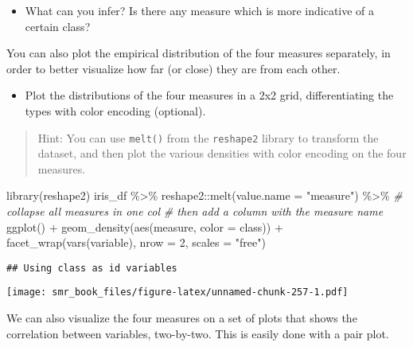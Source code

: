 \documentclass[
  oneside]{book}
\newenvironment{Shaded}{\begin{snugshade}}{\end{snugshade}}
\newcommand{\AttributeTok}[1]{\textcolor[rgb]{0.77,0.63,0.00}{#1}}
\newcommand{\CommentTok}[1]{\textcolor[rgb]{0.56,0.35,0.01}{\textit{#1}}}
\newcommand{\DecValTok}[1]{\textcolor[rgb]{0.00,0.00,0.81}{#1}}
\newcommand{\FunctionTok}[1]{\textcolor[rgb]{0.00,0.00,0.00}{#1}}
\newcommand{\NormalTok}[1]{#1}
\newcommand{\SpecialCharTok}[1]{\textcolor[rgb]{0.00,0.00,0.00}{#1}}
\newcommand{\StringTok}[1]{\textcolor[rgb]{0.31,0.60,0.02}{#1}}
\providecommand{\tightlist}{%
  \setlength{\itemsep}{0pt}\setlength{\parskip}{0pt}}
\begin{document}
\begin{itemize}
\tightlist
\item
  What can you infer? Is there any measure which is more indicative of a certain class?
\end{itemize}

You can also plot the empirical distribution of the four measures
separately, in order to better visualize how far (or close) they
are from each other.

\begin{itemize}
\tightlist
\item
  Plot the distributions of the four measures in a 2x2
  grid, differentiating the types with color encoding (optional).
\end{itemize}

\begin{quote}
Hint: You can use \texttt{melt()} from the \texttt{reshape2} library to
transform the dataset, and then plot the various densities with
color encoding on the four measures.
\end{quote}

\begin{Shaded}
\begin{Highlighting}[]
\FunctionTok{library}\NormalTok{(reshape2)}
\NormalTok{iris\_df }\SpecialCharTok{\%\textgreater{}\%}
\NormalTok{  reshape2}\SpecialCharTok{::}\FunctionTok{melt}\NormalTok{(}\AttributeTok{value.name =} \StringTok{"measure"}\NormalTok{) }\SpecialCharTok{\%\textgreater{}\%} \CommentTok{\# collapse all measures in one col}
  \CommentTok{\# then add a column with the measure name}
  \FunctionTok{ggplot}\NormalTok{() }\SpecialCharTok{+}
  \FunctionTok{geom\_density}\NormalTok{(}\FunctionTok{aes}\NormalTok{(measure, }\AttributeTok{color =}\NormalTok{ class)) }\SpecialCharTok{+}
  \FunctionTok{facet\_wrap}\NormalTok{(}\FunctionTok{vars}\NormalTok{(variable), }\AttributeTok{nrow =} \DecValTok{2}\NormalTok{, }\AttributeTok{scales =} \StringTok{"free"}\NormalTok{)}
\end{Highlighting}
\end{Shaded}

\begin{verbatim}
## Using class as id variables
\end{verbatim}

\texttt{[image: smr\_book\_files/figure-latex/unnamed-chunk-257-1.pdf]}

We can also visualize the four measures on a set of plots that shows
the correlation between variables, two-by-two. This is easily
done with a pair plot.
\end{document}
